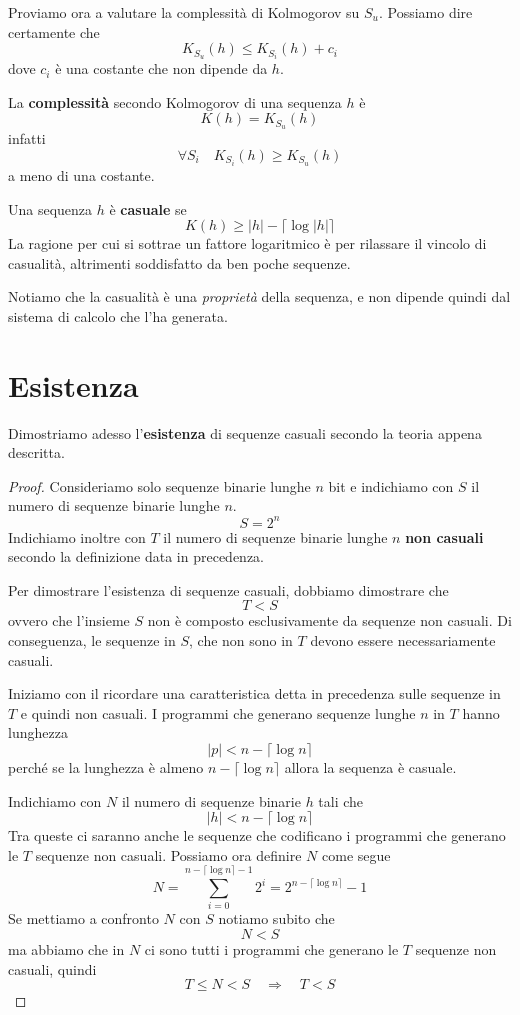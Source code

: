 Proviamo ora a valutare la complessit\`a di Kolmogorov su $S_u$. Possiamo dire certamente che
\[ K_{S_u}(h) \leq K_{S_i}(h) + c_i \]
dove $c_i$ \`e una costante che non dipende da $h$.

\begin{definition}
	La \textbf{complessit\`a} secondo Kolmogorov di una sequenza $h$ \`e
	\[ K(h) = K_{S_u}(h) \]
	infatti
	\[ \forall S_i \quad K_{S_i}(h) \geq K_{S_u}(h) \]
	a meno di una costante.
\end{definition}

\begin{definition}
	Una sequenza $h$ \`e \textbf{casuale} se
	\[ K(h) \geq |h| - \lceil \log |h| \rceil \]
	La ragione per cui si sottrae un fattore logaritmico \`e per rilassare il vincolo di casualit\`a, altrimenti
	soddisfatto da ben poche sequenze.
\end{definition}

Notiamo che la casualit\`a \`e una \emph{propriet\`a} della sequenza, e non dipende quindi dal sistema di calcolo
che l'ha generata.

\section{Esistenza}\label{esistenza_casualita}
Dimostriamo adesso l'\textbf{esistenza} di sequenze casuali secondo la teoria appena descritta.

\begin{proof}
	Consideriamo solo sequenze binarie lunghe $n$ bit e indichiamo con $S$ il numero di sequenze binarie lunghe $n$.
	\[ S = 2^n \]
	Indichiamo inoltre con $T$ il numero di sequenze binarie lunghe $n$ \textbf{non casuali} secondo la definizione data
	in precedenza.

	Per dimostrare l'esistenza di sequenze casuali, dobbiamo dimostrare che
	\[ T < S\]
	ovvero che l'insieme $S$ non \`e composto esclusivamente da sequenze non casuali. Di conseguenza, le sequenze in
	$S$, che non sono in $T$ devono essere necessariamente casuali.

	Iniziamo con il ricordare una caratteristica detta in precedenza sulle sequenze in $T$ e quindi non casuali. I
	programmi che generano sequenze lunghe $n$ in $T$ hanno lunghezza
	\[ |p| < n - \lceil \log n \rceil \]
	perch\'e se la lunghezza \`e almeno $n - \lceil \log n \rceil$ allora la sequenza \`e casuale.

	Indichiamo con $N$ il numero di sequenze binarie $h$ tali che
	\[ |h| < n - \lceil \log n \rceil \]
	Tra queste ci saranno anche le sequenze che codificano i programmi che generano le $T$ sequenze non casuali. Possiamo
	ora definire $N$ come segue
	\[ N = \sum_{i=0}^{n - \lceil \log n \rceil - 1} 2^i = 2^{n - \lceil \log n \rceil} - 1 \]
	Se mettiamo a confronto $N$ con $S$ notiamo subito che
	\[ N < S \]
	ma abbiamo che in $N$ ci sono tutti i programmi che generano le $T$ sequenze non casuali, quindi
	\[ T \leq N < S \quad \Rightarrow \quad T < S \]
\end{proof}

